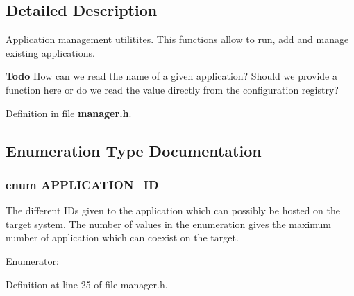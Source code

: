 \subsection{Detailed Description}
Application management utilitites. This functions allow to run, add and manage existing applications.

\begin{Desc}
\item[{\bf Todo}]How can we read the name of a given application? Should we provide a function here or do we read the value directly from the configuration registry? \end{Desc}


Definition in file {\bf manager.h}.



\subsection{Enumeration Type Documentation}
\subsubsection[{APPLICATION\_\-ID}]{\setlength{\rightskip}{0pt plus 5cm}enum {\bf APPLICATION\_\-ID}}\label{db/d45/manager_8h_aca7b349f156f649a8425db1bc765e070}
The different IDs given to the application which can possibly be hosted on the target system. The number of values in the enumeration gives the maximum number of application which can coexist on the target. \begin{Desc}
\item[Enumerator: ]\par
\begin{description}
\item[{\em 
APP\_\-0\label{db/d45/manager_8h_aca7b349f156f649a8425db1bc765e070a302167127e6e15d34c39ae2c56847bc3}
}]\item[{\em 
APP\_\-1\label{db/d45/manager_8h_aca7b349f156f649a8425db1bc765e070ae424423dc4421c9aa78ea7062c16b24b}
}]\end{description}
\end{Desc}



Definition at line 25 of file manager.h.



